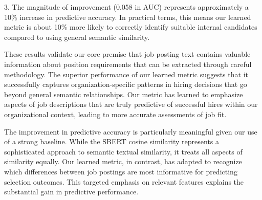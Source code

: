 3. The magnitude of improvement (0.058 in AUC) represents approximately a 10\% increase in predictive accuracy. In practical terms, this means our 
learned metric is about 10\% more likely to correctly identify suitable internal candidates compared to using general semantic similarity.

These results validate our core premise that job posting text contains valuable information about position requirements that can be extracted through 
careful methodology. The superior performance of our learned metric suggests that it successfully captures organization-specific patterns in hiring 
decisions that go beyond general semantic relationships. Our metric has learned to emphasize aspects of job descriptions that are truly predictive of 
successful hires within our organizational context, leading to more accurate assessments of job fit.

The improvement in predictive accuracy is particularly meaningful given our use of a strong baseline. While the SBERT cosine similarity represents a 
sophisticated approach to semantic textual similarity, it treats all aspects of similarity equally. Our learned metric, in contrast, has adapted to 
recognize which differences between job postings are most informative for predicting selection outcomes. This targeted emphasis on relevant features 
explains the substantial gain in predictive performance.